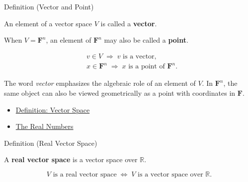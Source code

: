 \begin{definitionbox}{Definition (Vector and Point)}
\begin{definition}
\label{def:vector-and-point}
An element of a vector space $V$ is called a \textbf{vector}.

When $V = \mathbf{F}^n$, an element of $\mathbf{F}^n$ may also be called
a \textbf{point}.
\end{definition}
\end{definitionbox}

\begin{remark*}
\[
\begin{aligned}
&v \in V \;\Longrightarrow\; v \text{ is a vector}, \\
&x \in \mathbf{F}^n \;\Longrightarrow\; x \text{ is a point of } \mathbf{F}^n.
\end{aligned}
\]
\end{remark*}

\begin{remark*}[Interpretation]
The word \emph{vector} emphasizes the algebraic role of an element of $V$.
In $\mathbf{F}^n$, the same object can also be viewed geometrically as a point
with coordinates in $\mathbf{F}$.
\end{remark*}

\begin{dependencies}
\begin{itemize}
  \item \hyperref[def:vector-space]{Definition: Vector Space}
  \item \hyperref[def:reals]{The Real Numbers}
\end{itemize}
\end{dependencies}


\begin{definitionbox}{Definition (Real Vector Space)}
\begin{definition}
\label{def:real-vector-space}
A \textbf{real vector space} is a vector space over $\mathbb{R}$.
\end{definition}
\end{definitionbox}

\begin{remark*}
\[
V \text{ is a real vector space}
\;\Longleftrightarrow\;
V \text{ is a vector space over } \mathbb{R}.
\]
\end{remark*}

